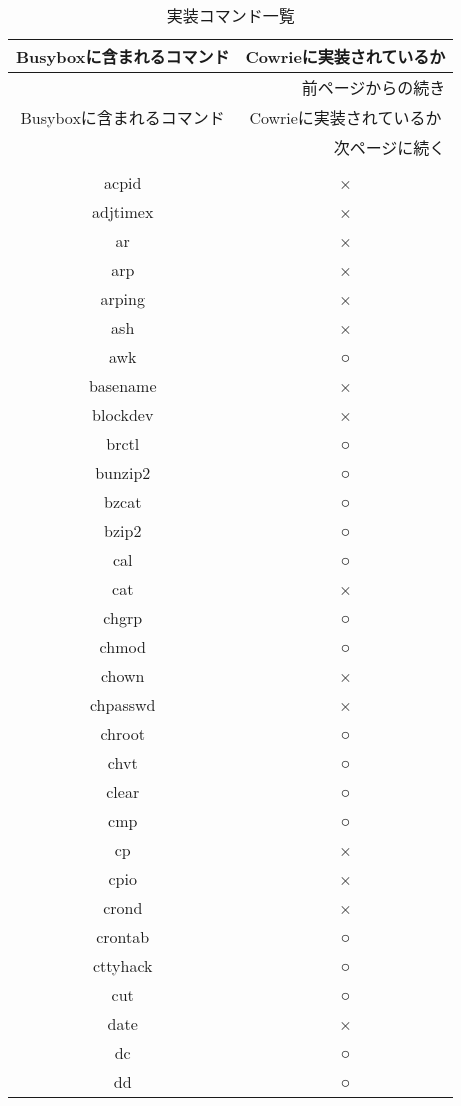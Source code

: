 \begin{longtable}{cc}
 \caption{実装コマンド一覧}
 \label{table:command} \\

 \hline
 Busyboxに含まれるコマンド & Cowrieに実装されているか \\ \hline\hline
 \endfirsthead
 \multicolumn{2}{r}{前ページからの続き} \\ \hline
 Busyboxに含まれるコマンド & Cowrieに実装されているか \\ \hline\hline
 \endhead
 \hline
 \multicolumn{2}{r}{次ページに続く} \\
 \endfoot
 \hline
 \multicolumn{2}{r}{以上} \\
 \endlastfoot
acpid & × \\ \hline
adjtimex & × \\ \hline
ar & × \\ \hline
arp & × \\ \hline
arping & × \\ \hline
ash & × \\ \hline
awk & ○ \\ \hline
basename & × \\ \hline
blockdev & × \\ \hline
brctl & ○ \\ \hline
bunzip2 & ○ \\ \hline
bzcat & ○ \\ \hline
bzip2 & ○ \\ \hline
cal & ○ \\ \hline
cat & × \\ \hline
chgrp & ○ \\ \hline
chmod & ○ \\ \hline
chown & × \\ \hline
chpasswd & × \\ \hline
chroot & ○ \\ \hline
chvt & ○ \\ \hline
clear & ○ \\ \hline
cmp & ○ \\ \hline
cp & × \\ \hline
cpio & × \\ \hline
crond & × \\ \hline
crontab & ○ \\ \hline
cttyhack & ○ \\ \hline
cut & ○ \\ \hline
date & × \\ \hline
dc & ○ \\ \hline
dd & ○ \\ \hline

\end{longtable}
